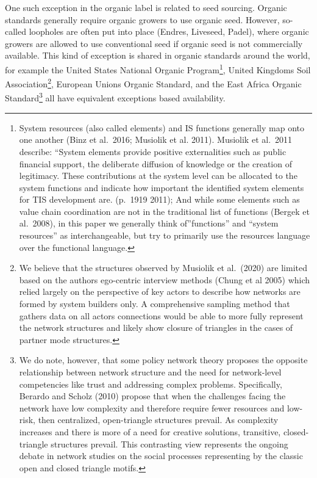 \documentclass[twoside,12pt,final]{ucthesis-CA2012}
\begin{document}
\begin{ucmainmatter}
One such exception in the organic label is related to seed sourcing.
Organic standards generally require organic growers to use organic seed.
However, so-called \textquotesingle loopholes\textquotesingle{} are often put into place (Endres,
Liveseed, Padel), where organic growers are allowed to use conventional
seed if organic seed is not commercially available. This kind of
exception is shared in organic standards around the world, for example
the United States\textquotesingle{} National Organic Program\footnote{System resources (also called \textquotesingle elements\textquotesingle) and IS functions
  generally map onto one another (Binz et al.~2016; Musiolik et al.
  2011). Musiolik et al.~2011 describe: ``System elements provide
  positive externalities such as public financial support, the
  deliberate diffusion of knowledge or the creation of legitimacy.
  These contributions at the system level can be allocated to the
  system functions and indicate how important the identified system
  elements for TIS development are.\textquotesingle{} (p.~1919 2011); And while some
  elements such as \textquotesingle value chain coordination\textquotesingle{} are not in the
  traditional list of functions (Bergek et al.~2008), in this paper we
  generally think of''functions'' and ``system resources'' as
  interchangeable, but try to primarily use the \textquotesingle resources\textquotesingle{} language
  over the \textquotesingle functional\textquotesingle{} language.}, United Kingdom\textquotesingle s Soil
Association\footnote{We believe that the structures observed by Musiolik et al.~(2020)
  are limited based on the authors\textquotesingle{} \textquotesingle ego-centric\textquotesingle{} interview methods
  (Chung et al 2005) which relied largely on the perspective of key
  actors to describe how networks are formed by system builders only.
  A comprehensive sampling method that gathers data on all actors\textquotesingle{}
  connections would be able to more fully represent the network
  structures and likely show \textquotesingle closure\textquotesingle{} of triangles in the cases of
  partner mode structures.}, European Union\textquotesingle s Organic Standard, and the East Africa
Organic Standard\footnote{We do note, however, that some policy network theory proposes the
  opposite relationship between network structure and the need for
  network-level competencies like trust and addressing complex
  problems. Specifically, Berardo and Scholz (2010) propose that when
  the challenges facing the network have low complexity and therefore
  require fewer resources and low-risk, then centralized,
  open-triangle structures prevail. As complexity increases and there
  is more of a need for creative solutions, transitive,
  closed-triangle structures prevail. This contrasting view represents
  the ongoing debate in network studies on the social processes
  representing by the classic open and closed triangle motifs.} all have equivalent exceptions based availability.


\end{ucmainmatter}
\end{document}
